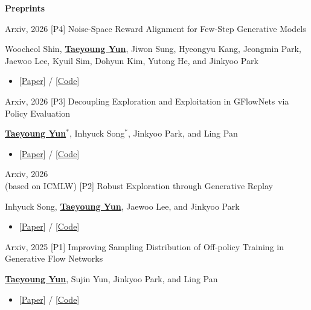 \documentclass[10pt]{developercv} %
\begin{document}


\textbf{Preprints}
\vspace{8pt}
\begin{entrylist}
    \entry
        {Arxiv, 2026}
        {[P4] Noise-Space Reward Alignment for Few-Step Generative Models}
        {}
        {Woocheol Shin, \underline{\textbf{Taeyoung Yun}}, Jiwon Sung, Hyeongyu Kang, Jeongmin Park, Jaewoo Lee, Kyuil Sim, Dohyun Kim, Yutong He, and Jinkyoo Park
        \begin{itemize}[noitemsep,topsep=2pt,parsep=2pt,partopsep=0pt, leftmargin=0pt]
            \item[]{[\href{https://arxiv.org/abs/2610.21125}{Paper}] / [\href{https://github.com/Shin-woocheol/NPO}{Code}]}
        \end{itemize}
        }
    \entry
        {Arxiv, 2026}
        {[P3] Decoupling Exploration and Exploitation in GFlowNets via Policy Evaluation}
        {}
        {\underline{\textbf{Taeyoung Yun}$^{*}$}, Inhyuck Song$^{*}$, Jinkyoo Park, and Ling Pan
        \begin{itemize}[noitemsep,topsep=2pt,parsep=2pt,partopsep=0pt, leftmargin=0pt]
            \item[]{[\href{}{Paper}] / [\href{}{Code}]}
        \end{itemize}
        }
    \entry
        {Arxiv, 2026 \\ (based on ICMLW)}
        {[P2] Robust Exploration through Generative Replay}
        {}
        {Inhyuck Song, \underline{\textbf{Taeyoung Yun}}, Jaewoo Lee, and Jinkyoo Park
        \begin{itemize}[noitemsep,topsep=2pt,parsep=2pt,partopsep=0pt, leftmargin=0pt]
            \item[]{[\href{https://openreview.net/forum?id=sJbMlWrd9b}{Paper}] / [\href{}{Code}]}
        \end{itemize}
        }
    \entry
        {Arxiv, 2025}
        {[P1] Improving Sampling Distribution of Off-policy Training in Generative Flow Networks}
        {}
        {\underline{\textbf{Taeyoung Yun}}, Sujin Yun, Jinkyoo Park, and Ling Pan
        \begin{itemize}[noitemsep,topsep=2pt,parsep=2pt,partopsep=0pt, leftmargin=0pt]
            \item[]{[\href{https://openreview.net/forum?id=yyMfN4EHqD}{Paper}] / [\href{}{Code}]}
        \end{itemize}
        }
    \vspace{-3pt}
    
\end{entrylist}
\end{document}
